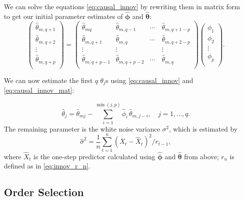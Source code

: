 \documentclass[a4paper, oneside]{discothesis}
\begin{document}
We can solve the equations \eqref{eq:causal_innov} by rewriting them in matrix form to get our initial parameter estimates of $\hat{\boldsymbol{\phi}}$ and $\hat{\boldsymbol{\theta}}$:
\begin{equation} \label{eq:causal_innov_mat}
    \begin{pmatrix}
    \hat{\theta}_{m,q+1} \\
    \hat{\theta}_{m,q+2} \\
    \vdots \\
    \hat{\theta}_{m,q+p} \\
\end{pmatrix}
=
\begin{pmatrix}
    \hat{\theta}_{mq} & \hat{\theta}_{m,q-1} & \cdots & \hat{\theta}_{m,q+1-p} \\
    \hat{\theta}_{m,q+1} & \hat{\theta}_{m,q} & \cdots & \hat{\theta}_{m,q+2-p} \\
    \vdots & \vdots & \quad & \vdots \\
    \hat{\theta}_{m,q+p-1} & \hat{\theta}_{m,q+p-2} & \cdots & \hat{\theta}_{m,q} \\ 
\end{pmatrix}
\begin{pmatrix}
    \phi_1 \\
    \phi_2 \\
    \vdots \\
    \phi_p \\
\end{pmatrix}.
\end{equation}

We can now estimate the first $q$ $\theta_j$s using \eqref{eq:causal_innov} and \eqref{eq:causal_innov_mat}:

\begin{equation*}
    \hat{\theta}_{j} = \hat{\theta}_{mj} - \sum_{i=1}^{\min(j, p)} \hat{\phi}_i \, \hat{\theta}_{m, j-i}, \quad j = 1, \dots, q.
\end{equation*}
\newpage
The remaining parameter is the white noise variance $\sigma^2$, which is estimated by
\begin{equation*}
    \hat{\sigma}^2 = \frac{1}{n} \sum_{t=1}^n \left(X_t - \hat{X}_t\right)^2 / r_{t-1},
\end{equation*}
where $\hat{X}_t$ is the one-step predictor calculated using $\hat{\boldsymbol{\phi}}$ and $\hat{\boldsymbol{\theta}}$ from above; $r_n$ is defined as in \eqref{eq:innov_r_n}.

\subsection{Order Selection}
\end{document}
